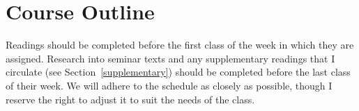 \documentclass[titlepage]{article}
\newcommand\policy{../policy}
\begin{document}


\section{Course Outline}
\label{outline}

Readings should be completed before the first class of the week in which
they are assigned. Research into seminar texts and any supplementary
readings that I circulate (see Section~\ref{supplementary}) should be
completed before the last class of their week. We will adhere to the
schedule as closely as possible, though I reserve the right to adjust it
to suit the needs of the class.

\newcommand\Yhwh{\textsc{Yhwh}}
\newcommand\rarr{\char"2192\hspace*{0.5pt}}
\end{document}
